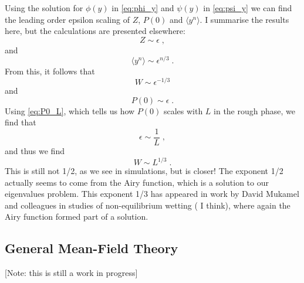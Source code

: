 \documentclass[a4paper,10pt]{article}
\newcommand{\pzero}{P(0)}
\begin{document}
Using the solution for $\phi(y)$ in \eqref{eq:phi_y} and $\psi(y)$ in \eqref{eq:psi_y} we can find the leading order epsilon scaling of $Z$, $P(0)$ and $\langle y^n \rangle$. I summarise the results here, but the calculations are presented elsewhere:
\begin{equation}
  Z \sim \epsilon \;,
\end{equation}
and
\begin{equation}
  \langle y^n \rangle \sim \epsilon ^{n/3} \;.
\end{equation}
From this, it follows that 
\begin{equation}
  W \sim \epsilon^{-1/3}
\end{equation}
and
\begin{equation}
  \pzero \sim \epsilon \;. 
\end{equation}
Using \eqref{eq:P0_L}, which tells us how $\pzero$ scales with $L$ in the rough phase, we find that
\begin{equation}
  \epsilon \sim \frac{1}{L} \;, 
\end{equation}
and thus we find
\begin{equation}
  W \sim L^{1/3} \;.  
\end{equation}
This is still not 1/2, as we see in simulations, but is closer! The exponent 1/2 actually seems to come from the Airy function, which is a solution to our eigenvalues problem. This exponent 1/3 has appeared in work by David Mukamel and colleagues in studies of non-equilibrium wetting (\cite{Hinrichsen1997,Hinrichsen2000,Hinrichsen2003} I think), where again the Airy function formed part of a solution.

\subsection{General Mean-Field Theory}

[Note: this is still a work in progress]
\end{document}
